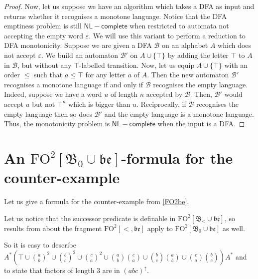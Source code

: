 \documentclass[a4paper,UKenglish,cleveref, autoref, thm-restate]{lipics-v2021}
\newcommand{\FO}{\mathrm{FO}}
\newcommand{\FOtw}{\FO^2}
\newcommand{\be}{\mathfrak{be}}
\newcommand{\bin}{\mathfrak{B}}
\newcommand{\NL}{\mathsf{NL}}
\newcommand{\comp}{\mathsf{complete}}
\newcommand{\aut}{\mathcal{B}}
\begin{document}
\begin{proof}
    Now, let us suppose we have an algorithm which takes a DFA as input and returns whether it recognises a monotone language.
    Notice that the DFA emptiness problem is still $\NL-\comp$ when restricted to automata not accepting the empty word $\varepsilon$. We will use this variant to perform a reduction to DFA monotonicity.
    Suppose we are given a DFA $\aut$ on an alphabet $A$ which does not accept $\varepsilon$.
    We build an automaton $\aut'$ on $A \cup \{\top\}$ by adding the letter $\top$ to $A$ in $\aut$, but without any $\top$-labelled transition.
    Now, let us equip $A \cup \{\top\}$ with an order $\leq$ such that $a \leq \top$ for any letter $a$ of $A$.
    Then the new automaton $\aut'$ recognises a monotone language if and only if $\aut$ recognises the empty language.
    Indeed, suppose we have a word $u$ of length $n$ accepted by $\aut$.
    Then, $\aut'$ would accept $u$ but not $\top^n$ which is bigger than $u$.
    Reciprocally, if $\aut$ recognises the empty language then so does $\aut'$ and the empty language is a monotone language.
    Thus, the monotonicity problem is $\NL-\comp$ when the input is a DFA.

    
\end{proof}


















\section{\texorpdfstring{An $\FOtw[\bin_0 \cup \be]$-formula for the counter-example}{An FO2[<,S,,be]-formula for the counter-example}} \label{ap:formula}



Let us give a formula for the counter-example from \cref{FO2be}.



Let us notice that the successor predicate is definable in $\FOtw[\bin_< \cup \be]$, so results from \cite{between} about the fragment $\FOtw[<,\be]$ apply to $\FOtw[\bin_0 \cup \be]$ as well.



So it is easy to describe $A^*(
        \top \cup
        \binom{a}{b}^2 \cup \binom{b}{c}^2 \cup \binom{c}{a}^2 \cup
        \binom{a}{b}\binom{c}{a} \cup
        \binom{b}{c}\binom{a}{b} \cup
        \binom{c}{a}\binom{b}{c}
    )A^*$
and to state that factors of length $3$ are in $(abc)^\uparrow$.
\end{document}
